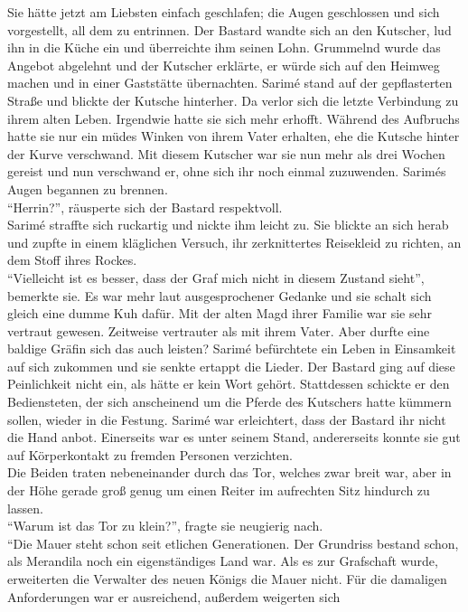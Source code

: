 Sie hätte jetzt am Liebsten einfach geschlafen; die Augen geschlossen und sich vorgestellt, all dem 
zu entrinnen. Der Bastard wandte sich an den Kutscher, lud ihn in die Küche ein und überreichte ihm 
seinen Lohn. Grummelnd wurde das Angebot abgelehnt und der Kutscher erklärte, er würde sich auf den 
Heimweg machen und in einer Gaststätte übernachten. Sarimé stand auf der gepflasterten Straße und 
blickte der Kutsche hinterher. Da verlor sich die letzte Verbindung zu ihrem alten Leben. Irgendwie 
hatte sie sich mehr erhofft. Während des Aufbruchs hatte sie nur ein müdes Winken von ihrem Vater 
erhalten, ehe die Kutsche hinter der Kurve verschwand. Mit diesem Kutscher war sie nun mehr als 
drei Wochen gereist und nun verschwand er, ohne sich ihr noch einmal zuzuwenden. Sarimés Augen 
begannen zu brennen.\\
``Herrin?'', räusperte sich der Bastard respektvoll. \\
Sarimé straffte sich ruckartig und nickte ihm leicht zu. Sie blickte an sich herab und zupfte in 
einem kläglichen Versuch, ihr zerknittertes Reisekleid zu richten, an dem Stoff ihres Rockes. \\
``Vielleicht ist es besser, dass der Graf mich nicht in diesem Zustand sieht'', bemerkte sie. Es 
war mehr laut ausgesprochener Gedanke und sie schalt sich gleich eine dumme Kuh dafür. Mit der 
alten Magd ihrer Familie war sie sehr vertraut gewesen. Zeitweise vertrauter als mit ihrem Vater. 
Aber durfte eine baldige Gräfin sich das auch leisten? Sarimé befürchtete ein Leben in Einsamkeit 
auf sich zukommen und sie senkte ertappt die Lieder. Der Bastard ging auf diese Peinlichkeit nicht 
ein, als hätte er kein Wort gehört. Stattdessen schickte er den Bediensteten, der sich anscheinend 
um die Pferde des Kutschers hatte kümmern sollen, wieder in die Festung. Sarimé war erleichtert, 
dass der Bastard ihr nicht die Hand anbot. Einerseits war es unter seinem Stand, andererseits konnte 
sie gut auf Körperkontakt zu fremden Personen verzichten.\\
Die Beiden traten nebeneinander durch das Tor, welches zwar breit war, aber in der Höhe gerade groß 
genug um einen Reiter im aufrechten Sitz hindurch zu lassen.\\
``Warum ist das Tor zu klein?'', fragte sie neugierig nach.\\
``Die Mauer steht schon seit etlichen Generationen. Der Grundriss bestand schon, als Merandila noch 
ein eigenständiges Land war. Als es zur Grafschaft wurde, erweiterten die Verwalter des neuen 
Königs die Mauer nicht. Für die damaligen Anforderungen war er ausreichend, außerdem weigerten sich 
